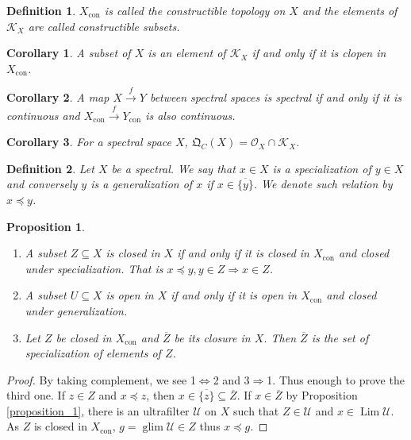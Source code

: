 \documentclass[8pt]{article}
\numberwithin{equation}{section}
\newtheorem{proposition}{Proposition}[subsection]
\newtheorem{definition}{Definition}[subsection]
\newtheorem{corollary}{Corollary} [subsection]
\DeclareMathOperator{\Lim}{Lim}
\DeclareMathOperator{\glim}{glim}
\DeclareMathOperator{\con}{con}
\newcommand{\Ouv}{\mathscr{O}}
\newcommand{\U}[0]{\mathcal{U}}
\newcommand{\K}[0]{\mathcal{K}}
\newcommand{\QC}[0]{\mathfrak{Q}_C}
\begin{document}
\begin{definition}
    \label{definition_13}
    $X_{\con}$ is called the constructible topology on $X$ and the elements of $\K_X$ are called constructible subsets.
\end{definition}
\begin{corollary}
    \label{corollary_4}
    A subset of $X$ is an element of $\K_X$ if and only if it is clopen in $X_{\con}$.
\end{corollary}
\begin{corollary}%
    A map $X\stackrel{f}{\to}Y$ between spectral spaces is spectral if and only if it is continuous and $X_{\con}\stackrel{f}{\to}Y_{\con}$ is also continuous.
\end{corollary}
\begin{corollary}
    \label{corollary_15}
    For a spectral space $X$, $\QC(X) = \Ouv_X\cap\K_X$.
\end{corollary}
\begin{definition}
    \label{definition_14}
    Let $X$ be a spectral. We say that $x\in X$ is a specialization of $y\in X$ and conversely $y$ is a generalization of $x$ if $x\in\overline{\{y\}}$. We denote such relation by $x\preceq y$.
\end{definition}
\begin{proposition}$\:$
    \label{proposition_6}
    \begin{enumerate}[1.]
    \item A subset $Z\subseteq X$ is closed in $X$ if and only if it is closed in $X_{\con}$ and closed under specialization. That is $x\preceq y,y\in Z\Rightarrow x\in Z$.
    \item A subset $U\subseteq X$ is open in $X$ if and only if it is open in $X_{\con}$ and closed under generalization.
    \item Let $Z$ be closed in $X_{\con}$ and $\overline{Z}$ be its closure in $X$. Then $\overline{Z}$ is the set of specialization of elements of $Z$.
\end{enumerate}
\end{proposition}
\begin{proof}
By taking complement, we see 1$\Leftrightarrow$2 and 3$\Rightarrow$1. Thus enough to prove the third one. If $z\in Z$ and $x\preceq z$, then $x\in\overline{\{z\}}\subseteq\overline{Z}$. If $x\in\overline{Z}$ by Proposition \ref{proposition_1}, there is an ultrafilter $\U$ on $X$ such that $Z\in\U$ and $x\in\Lim\U$. As $Z$ is closed in $X_{\con}$, $g=\glim\U\in Z$ thus $x\preceq g$.
\end{proof}
\end{document}
